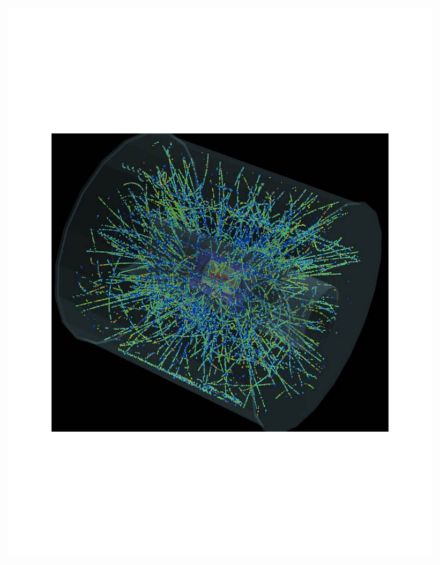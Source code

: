 \documentclass[
	11pt, %
]{beamer}
\begin{document}
\begin{frame}
\begin{figure}
	\includegraphics[scale=.2]{cern_collision.pdf}
\end{figure}
\end{frame}
\end{document}
